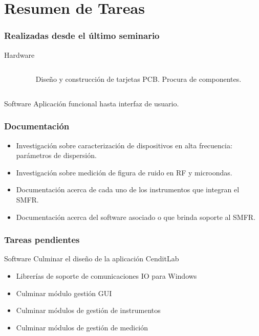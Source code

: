 \documentclass[xcolor=pdftext, table]{beamer}
\begin{document}
	\section{Resumen de Tareas}
	
		\begin{frame}	
			\frametitle{Realizadas desde el último seminario}
			
			\begin{block}{Hardware}				
				\begin{columns}
					\begin{column}{6cm} 
						
						
						
					\end{column}
					\begin{column}{6cm} 
						Diseño y construcción de tarjetas PCB.
						Procura de componentes.
					\end{column}
				\end{columns}	
			\end{block}
		

			
			\begin{block}{Software}
				Aplicación funcional hasta interfaz de usuario.
			\end{block}
		
		\end{frame}

	\begin{frame}
		\frametitle{Documentación}
		
		\begin{itemize}
		 	\item Investigación sobre caracterización de dispositivos en alta frecuencia: parámetros de dispersión.
		 	\item Investigación sobre medición de figura de ruido en RF y microondas.
		 	\item Documentación acerca de cada uno de los instrumentos que integran el SMFR.
		 	\item Documentación acerca del software asociado o que brinda soporte al SMFR.				
		 \end{itemize}		

	\end{frame}

	\begin{frame}
		\frametitle{Tareas pendientes}	
			
			\begin{block}{Software}
				Culminar el diseño de la aplicación CenditLab
				\begin{itemize}
					\item Librerías de soporte de comunicaciones IO para Windows
					\item Culminar módulo gestión GUI
					\item Culminar módulos de gestión de instrumentos
					\item Culminar módulos de gestión de medición
				\end{itemize}
					
			\end{block}		

		\end{frame}
	
\end{document}
